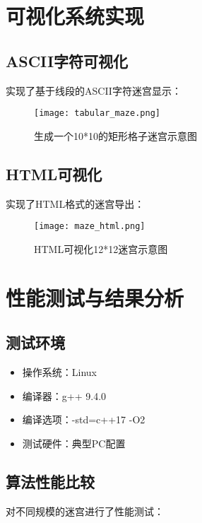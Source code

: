 \documentclass[UTF8]{ctexart}
\begin{document}
\newpage
\section{可视化系统实现}

\subsection{ASCII字符可视化}

实现了基于线段的ASCII字符迷宫显示：

\begin{figure}[h!]
    \centering
    \texttt{[image: tabular\_maze.png]}
    \caption{生成一个10*10的矩形格子迷宫示意图}
    \label{fig:矩形迷宫}
\end{figure}

\subsection{HTML可视化}

实现了HTML格式的迷宫导出：

\begin{figure}[h!]
    \centering
    \texttt{[image: maze\_html.png]}
    \caption{HTML可视化12*12迷宫示意图}
    \label{fig:maze_html}
\end{figure}
\newpage

\section{性能测试与结果分析}

\subsection{测试环境}
\begin{itemize}
    \item 操作系统：Linux
    \item 编译器：g++ 9.4.0
    \item 编译选项：-std=c++17 -O2
    \item 测试硬件：典型PC配置
\end{itemize}

\subsection{算法性能比较}

对不同规模的迷宫进行了性能测试：
\end{document}
